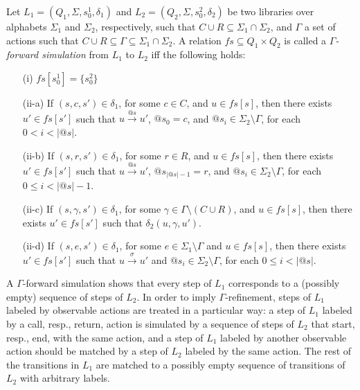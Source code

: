 \begin{dfn}
Let $L_1=(Q_1,\Sigma, s_0^1, \delta_1)$ and $L_2=(Q_2,\Sigma, s_0^2, \delta_2)$ be two libraries over alphabets $\Sigma_1$ and $\Sigma_2$, respectively, such that $C\cup R \subseteq \Sigma_1\cap\Sigma_2$, and $\Gamma$ a set of actions such that $C\cup R\subseteq \Gamma\subseteq \Sigma_1\cap\Sigma_2$. A relation $\mathit{fs} \subseteq Q_{1} \times Q_{2}$ is called a \emph{$\Gamma$-forward simulation} from $L_1$ to $L_2$ iff the following holds:
\begin{itemize}
\item[(i)] $\mathit{fs}[s_0^1] = \{s_0^2 \}$ 
\item[(ii-a)] If $(s,c,s') \in \delta_1$, for some $c\in C$, and $u \in \mathit{fs}[s]$, then there exists $u' \in \mathit{fs}[s']$ such that $u \xrightarrow{@s} u'$, $@s_0=c$, and $@s_i\in \Sigma_2\setminus\Gamma$, for each $0<i<|@s|$.
\item[(ii-b)] If $(s,r,s') \in \delta_{1}$, for some $r\in R$, and $u \in \mathit{fs}[s]$, then there exists $u' \in \mathit{fs}[s']$ such that $u \xrightarrow{@s} u'$, $@s_{|@s| -1}=r$, and $@s_i\in \Sigma_2\setminus\Gamma$, for each $0\leq i<|@s| -1$.
\item[(ii-c)] If $(s, \gamma , s') \in \delta_1$, for some $\gamma\in \Gamma\setminus (C\cup R)$, and $u \in fs[s]$, then there exists $u' \in fs[s']$ such that $\delta_2(u,\gamma, u')$. 
\item[(ii-d)] If $(s,e,s') \in \delta_1$, for some $e \in \Sigma_1\setminus \Gamma$ and $u \in \mathit{fs}[s]$, then there exists $u' \in \mathit{fs}[s']$ such that $u \xrightarrow{\sigma} u'$ and $@s_i\in \Sigma_2\setminus\Gamma$, for each $0\leq i<|@s|$.  
\end{itemize}
\end{dfn}
A $\Gamma$-forward simulation shows that every step of $L_1$ corresponds to a (possibly empty) sequence of steps of $L_2$. In order to imply $\Gamma$-refinement, steps of $L_1$ labeled by observable actions are treated in a particular way: a step of $L_1$ labeled by a call, resp., return, action is simulated by a sequence of steps of $L_2$ that start, resp., end, with the same action, and a step of $L_1$ labeled by another observable action should be matched by a step of $L_2$ labeled by the same action. The rest of the transitions in $L_1$ are matched to a possibly empty sequence of transitions of $L_2$ with arbitrary labels.

